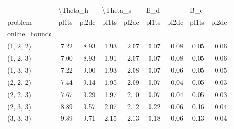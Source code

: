 \begin{tabular}{lrrrrrrrr}
\toprule
{} & \multicolumn{2}{l}{\textbackslash Theta\_h} & \multicolumn{2}{l}{\textbackslash Theta\_s} & \multicolumn{2}{l}{B\_d} & \multicolumn{2}{l}{B\_e} \\
problem &    pl1ts & pl2dc &    pl1ts & pl2dc & pl1ts & pl2dc & pl1ts & pl2dc \\
online\_bounds &          &       &          &       &       &       &       &       \\
\midrule
(1, 2, 2)     &     7.22 &  8.93 &     1.93 &  2.07 &  0.07 &  0.08 &  0.05 &  0.06 \\
(1, 2, 3)     &     7.00 &  8.93 &     1.91 &  2.07 &  0.07 &  0.08 &  0.05 &  0.06 \\
(1, 3, 3)     &     7.22 &  9.00 &     1.93 &  2.08 &  0.07 &  0.06 &  0.05 &  0.05 \\
(2, 2, 2)     &     7.44 &  9.14 &     1.95 &  2.09 &  0.07 &  0.04 &  0.05 &  0.03 \\
(2, 2, 3)     &     7.67 &  9.29 &     1.97 &  2.10 &  0.07 &  0.04 &  0.05 &  0.03 \\
(2, 3, 3)     &     8.89 &  9.57 &     2.07 &  2.12 &  0.22 &  0.06 &  0.16 &  0.04 \\
(3, 3, 3)     &     9.89 &  9.71 &     2.15 &  2.13 &  0.18 &  0.06 &  0.13 &  0.04 \\
\bottomrule
\end{tabular}
